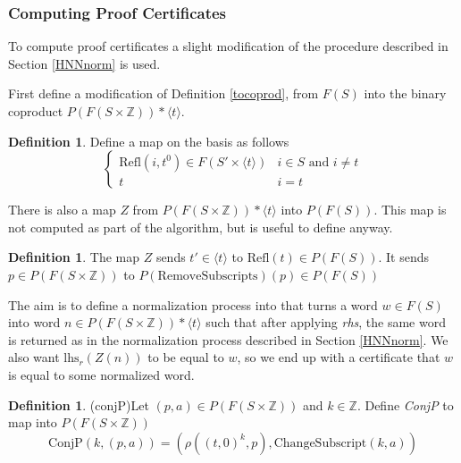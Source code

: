 \documentclass[12pt]{article} %
\theoremstyle{definition}
\theoremstyle{definition}
\theoremstyle{definition}
\theoremstyle{definition}
\theoremstyle{definition}
\newtheorem{defn}[theorem]{Definition}
\theoremstyle{definition}
\begin{document}
\subsubsection{Computing Proof Certificates}\label{HNNPC}

To compute proof certificates a slight modification of the procedure described in Section
\ref{HNNnorm} is used.

First define a modification of Definition \ref{tocoprod}, from $F(S)$ into the binary
coproduct $P(F(S \times \mathbb{Z})) \ast \langle t \rangle$.

\begin{defn}\label{tocoprodP}
  Define a map on the basis as follows
  \begin{equation}
    \begin{cases}
      \text{Refl}(i, t^0) \in F(S' \times \langle t \rangle) & i \in S \text{ and } i \ne t \\
      t & i = t
    \end{cases}
  \end{equation}
\end{defn}

There is also a map $Z$ from $P(F(S \times \mathbb{Z})) \ast \langle t \rangle$ into
$P(F(S))$. This map is not computed as part of the algorithm, but is useful to define anyway.

\begin{defn}
  The map $Z$ sends $t' \in \langle t \rangle$ to $\text{Refl}(t) \in P(F(S))$.
  It sends $p \in P(F(S \times \mathbb{Z}))$ to $P(\text{RemoveSubscripts})(p) \in P(F(S))$
\end{defn}

The aim is to define a normalization process into that turns a word $w \in F(S)$ into
word $n \in P(F(S \times \mathbb{Z})) \ast \langle t \rangle$
such that after applying \textit{rhs}, the same word is returned as in the
normalization process described in Section \ref{HNNnorm}. We also want
$\text{lhs}_r(Z(n))$ to be equal to $w$, so we end up with a certificate that $w$
is equal to some normalized word.

\begin{defn}(conjP)\label{conjP}
  Let $(p, a) \in P(F(S \times \mathbb{Z}))$ and $k \in \mathbb{Z}$.
  Define \textit{ConjP} to map into $P(F(S \times \mathbb{Z}))$
  \begin{equation}
    \text{ConjP}(k, (p, a)) = (\rho((t,0)^k, p), \text{ChangeSubscript}(k, a))
  \end{equation}
\end{defn}
\end{document}
